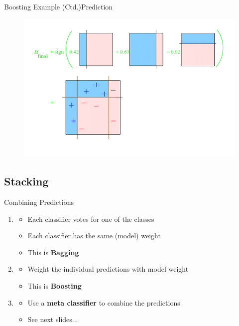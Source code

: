 \begin{frame}{Boosting Example (Ctd.)}{Prediction}
	\vspace*{-2mm}
	\begin{figure}
		\includegraphics[scale=0.45]{08_decision_trees/02_img/boosting_prediction}
	\end{figure}
\end{frame}


\subsection{Stacking}

\begin{frame}{Combining Predictions}{}
	\begin{enumerate}
		\item {} \checkmark
		\begin{itemize}
			\item Each classifier votes for one of the classes
			\item Each classifier has the same (model) weight
			\item This is \textbf{Bagging}
		\end{itemize}
		\item {} \checkmark
		\begin{itemize}
			\item Weight the individual predictions with model weight
			\item This is \textbf{Boosting}
		\end{itemize}
		\item {}
		\begin{itemize}
			\item Use a \textbf{meta classifier} to combine the predictions
			\item See next slides...
		\end{itemize}
	\end{enumerate}
\end{frame}


